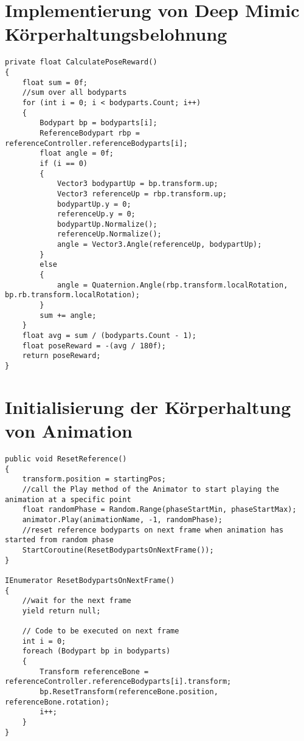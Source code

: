 \section{Implementierung von Deep Mimic Körperhaltungsbelohnung}
\begin{lstlisting}[caption={Implementierung von Deep Mimic Körperhaltungsbelohnung},captionpos=b,label={lst:skript_gehbewegungsbelohnungen}]
private float CalculatePoseReward()
{
    float sum = 0f;
    //sum over all bodyparts
    for (int i = 0; i < bodyparts.Count; i++)
    {
        Bodypart bp = bodyparts[i];
        ReferenceBodypart rbp = referenceController.referenceBodyparts[i];
        float angle = 0f;
        if (i == 0)
        {
            Vector3 bodypartUp = bp.transform.up;
            Vector3 referenceUp = rbp.transform.up;
            bodypartUp.y = 0;
            referenceUp.y = 0;
            bodypartUp.Normalize();
            referenceUp.Normalize();
            angle = Vector3.Angle(referenceUp, bodypartUp);
        }
        else
        {
            angle = Quaternion.Angle(rbp.transform.localRotation, bp.rb.transform.localRotation);
        }
        sum += angle;
    }
    float avg = sum / (bodyparts.Count - 1);
    float poseReward = -(avg / 180f);
    return poseReward;
}
\end{lstlisting}

\section{Initialisierung der Körperhaltung von Animation}
\label{code:animation_init}
\begin{lstlisting}[caption={Implementierung Initialisierung des Charakters mit Körperhaltung aus Animation},captionpos=b,label={lst:skript_körperhaltung_initialisierung}]
 public void ResetReference()
{
    transform.position = startingPos;
    //call the Play method of the Animator to start playing the animation at a specific point
    float randomPhase = Random.Range(phaseStartMin, phaseStartMax);
    animator.Play(animationName, -1, randomPhase);
    //reset reference bodyparts on next frame when animation has started from random phase
    StartCoroutine(ResetBodypartsOnNextFrame());
}

IEnumerator ResetBodypartsOnNextFrame()
{
    //wait for the next frame
    yield return null;

    // Code to be executed on next frame
    int i = 0;
    foreach (Bodypart bp in bodyparts)
    {
        Transform referenceBone = referenceController.referenceBodyparts[i].transform;
        bp.ResetTransform(referenceBone.position, referenceBone.rotation);
        i++;
    }
}
\end{lstlisting}
